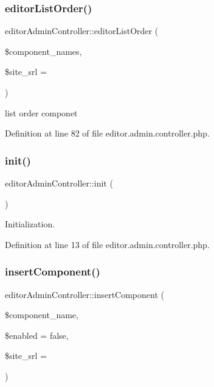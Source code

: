 \subsubsection{\texorpdfstring{editor\+List\+Order()}{editorListOrder()}}
{\footnotesize\ttfamily editor\+Admin\+Controller\+::editor\+List\+Order (\begin{DoxyParamCaption}\item[{}]{\$component\+\_\+names,  }\item[{}]{\$site\+\_\+srl = {} }\end{DoxyParamCaption})}



list order componet 



Definition at line 82 of file editor.\+admin.\+controller.\+php.

\hypertarget{classeditorAdminController_ad93d747ea21b3414d423dcb8b3b54760}{}\label{classeditorAdminController_ad93d747ea21b3414d423dcb8b3b54760} 
\subsubsection{\texorpdfstring{init()}{init()}}
{\footnotesize\ttfamily editor\+Admin\+Controller\+::init (\begin{DoxyParamCaption}{ }\end{DoxyParamCaption})}



Initialization. 



Definition at line 13 of file editor.\+admin.\+controller.\+php.

\hypertarget{classeditorAdminController_a38775ee5db2277eb943096661ae25fd9}{}\label{classeditorAdminController_a38775ee5db2277eb943096661ae25fd9} 
\subsubsection{\texorpdfstring{insert\+Component()}{insertComponent()}}
{\footnotesize\ttfamily editor\+Admin\+Controller\+::insert\+Component (\begin{DoxyParamCaption}\item[{}]{\$component\+\_\+name,  }\item[{}]{\$enabled = {\ttfamily false},  }\item[{}]{\$site\+\_\+srl = {} }\end{DoxyParamCaption})}



